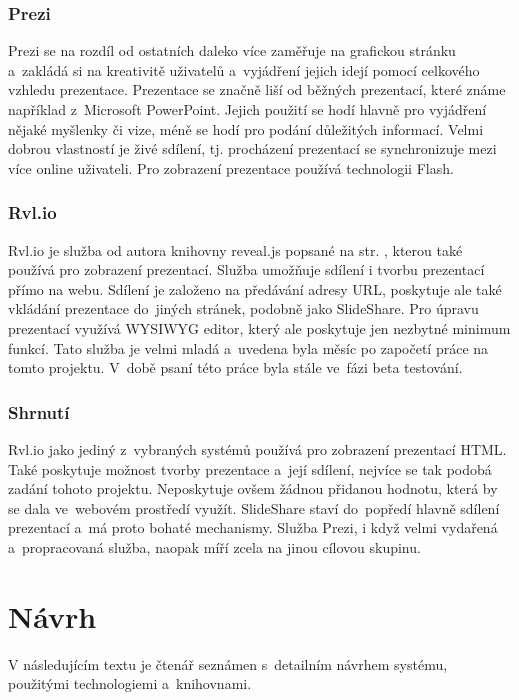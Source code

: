 \documentclass[11pt,twoside,a4paper]{book}
\begin{document}
\subsection{Prezi}
Prezi \cite{prezi} se na rozdíl od ostatních daleko více zaměřuje na grafickou stránku a~zakládá si na kreativitě uživatelů a~vyjádření jejich idejí pomocí celkového vzhledu prezentace. Prezentace se značně liší od běžných prezentací, které známe například z~Microsoft PowerPoint. Jejich použití se hodí hlavně pro vyjádření nějaké myšlenky či vize, méně se hodí pro podání důležitých informací. Velmi dobrou vlastností je živé sdílení, tj. procházení prezentací se synchronizuje mezi více online uživateli. Pro zobrazení prezentace používá technologii Flash.

\subsection{Rvl.io}
Rvl.io \cite{rvlio} je služba od autora knihovny reveal.js popsané na str. \pageref{chap:revealjs}, kterou také používá pro zobrazení prezentací. Služba umožňuje sdílení i tvorbu prezentací přímo na webu. Sdílení je založeno na předávání adresy URL, poskytuje ale také vkládání prezentace do~jiných stránek, podobně jako SlideShare. Pro úpravu prezentací využívá WYSIWYG editor, který ale poskytuje jen nezbytné minimum funkcí. Tato služba je velmi mladá a~uvedena byla měsíc po započetí práce na tomto projektu. V~době psaní této práce byla stále ve~fázi beta testování.

\subsection{Shrnutí}
Rvl.io jako jediný z~vybraných systémů používá pro zobrazení prezentací HTML. Také poskytuje možnost tvorby prezentace a~její sdílení, nejvíce se tak podobá zadání tohoto projektu. Neposkytuje ovšem žádnou přidanou hodnotu, která by se dala ve~webovém prostředí využít. SlideShare staví do~popředí hlavně sdílení prezentací a~má proto bohaté mechanismy. Služba Prezi, i když velmi vydařená a~propracovaná služba, naopak míří zcela na jinou cílovou skupinu.



\chapter{Návrh}
V následujícím textu je čtenář seznámen s~detailním návrhem systému, použitými technologiemi a~knihovnami.
\end{document}

